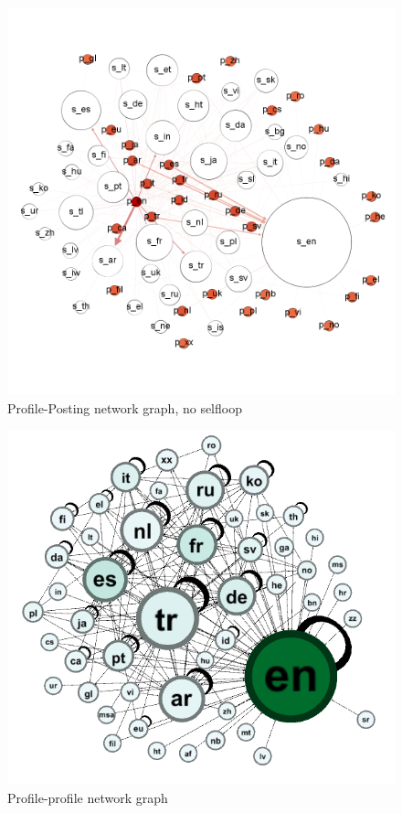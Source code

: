 \begin{figure}[htb]
\centering
\includegraphics[width=\columnwidth]{images/baltimore_p_s_lang_nsl.png}
\caption{Profile-Posting network graph, no selfloop}
\label{fig:baltimore_p_s_lang_nsl}
\end{figure}

\begin{figure}[htb]
\centering
\includegraphics[width=\columnwidth]{images/baltimoreprofileprofile.png}
\caption{Profile-profile network graph}
\label{fig:baltimoreprofileprofilegraph}
\end{figure}



